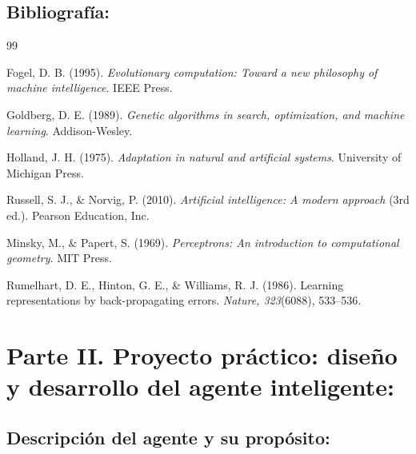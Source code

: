 \documentclass[letterpaper,12pt]{article}
\begin{document}
\subsection{Bibliografía:}

\begin{thebibliography}{99}



 Fogel, D. B. (1995). \textit{Evolutionary computation: Toward a new philosophy of machine intelligence}. IEEE Press.

 Goldberg, D. E. (1989). \textit{Genetic algorithms in search, optimization, and machine learning}. Addison-Wesley.

 Holland, J. H. (1975). \textit{Adaptation in natural and artificial systems}. University of Michigan Press.

 Russell, S. J., \& Norvig, P. (2010). \textit{Artificial intelligence: A modern approach} (3rd ed.). Pearson Education, Inc.

 Minsky, M., \& Papert, S. (1969). \textit{Perceptrons: An introduction to computational geometry}. MIT Press.

 Rumelhart, D. E., Hinton, G. E., \& Williams, R. J. (1986). Learning representations by back-propagating errors. \textit{Nature, 323}(6088), 533–536.



\end{thebibliography}

\newpage

\section{Parte II. Proyecto práctico: diseño y desarrollo del agente
inteligente:}

\subsection{Descripción del agente y su propósito:}
\end{document}

